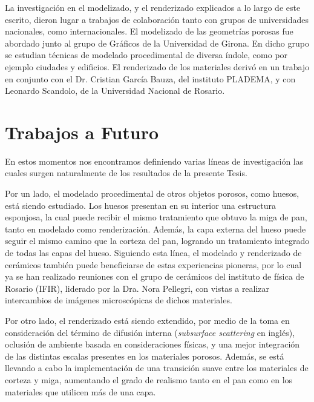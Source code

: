 La investigación en el modelizado, y el renderizado explicados a lo largo de este escrito, dieron lugar a trabajos de colaboración tanto con grupos de universidades nacionales, como internacionales.
El modelizado de las geometrías porosas fue abordado junto al grupo de Gráficos de la Universidad de Girona.
En dicho grupo se estudian técnicas de modelado procedimental de diversa índole, como por ejemplo ciudades y edificios.
El renderizado de los materiales derivó en un trabajo en conjunto con el Dr. Cristian García Bauza, del instituto PLADEMA, y con Leonardo Scandolo, de la Universidad Nacional de Rosario.



\section{Trabajos a Futuro}
En estos momentos nos encontramos definiendo varias líneas de investigación las cuales surgen naturalmente de los resultados de la presente Tesis.

Por un lado, el modelado procedimental de otros objetos porosos, como huesos, está siendo estudiado.
Los huesos presentan en su interior una estructura esponjosa, la cual puede recibir el mismo tratamiento que obtuvo la miga de pan, tanto en modelado como renderización.
Además, la capa externa del hueso puede seguir el mismo camino que la corteza del pan, logrando un tratamiento integrado de todas las capas del hueso.
Siguiendo esta línea, el modelado y renderizado de cerámicos también puede beneficiarse de estas experiencias pioneras, por lo cual ya se han realizado reuniones con el grupo de cerámicos del instituto de física de Rosario (IFIR), liderado por la Dra. Nora Pellegri, con vistas a realizar intercambios de imágenes microscópicas de dichos materiales.

Por otro lado, el renderizado está siendo extendido, por medio de la toma en consideración del término de difusión interna ({\em subsurface scattering} en inglés), oclusión de ambiente basada en consideraciones físicas, y una mejor integración de las distintas escalas presentes en los materiales porosos.
Además, se está llevando a cabo la implementación de una transición suave entre los materiales de corteza y miga, aumentando el grado de realismo tanto en el pan como en los materiales que utilicen más de una capa.

